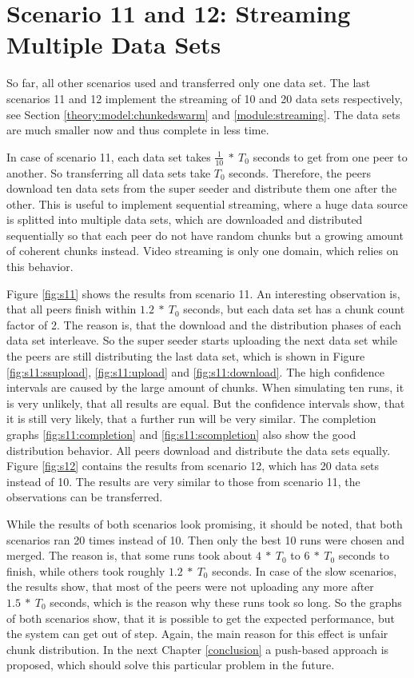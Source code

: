 \pagebreak
\section{Scenario 11 and 12: Streaming Multiple Data Sets}
\label{evaluation:1112}

So far, all other scenarios used and transferred only one data set. The last scenarios 11 and 12 implement the streaming of 10 and 20 data sets respectively, see Section \ref{theory:model:chunkedswarm} and \ref{module:streaming}. The data sets are much smaller now and thus complete in less time.

In case of scenario 11, each data set takes $\frac{1}{10}\:*\:T_0$ seconds to get from one peer to another. So transferring all data sets take $T_0$ seconds. Therefore, the peers download ten data sets from the super seeder and distribute them one after the other. This is useful to implement sequential streaming, where a huge data source is splitted into multiple data sets, which are downloaded and distributed sequentially so that each peer do not have random chunks but a growing amount of coherent chunks instead. Video streaming is only one domain, which relies on this behavior.

Figure \ref{fig:s11} shows the results from scenario 11. An interesting observation is, that all peers finish within $1.2\:*\:T_0$ seconds, but each data set has a chunk count factor of 2. The reason is, that the download and the distribution phases of each data set interleave. So the super seeder starts uploading the next data set while the peers are still distributing the last data set, which is shown in Figure \ref{fig:s11:ssupload}, \ref{fig:s11:upload} and \ref{fig:s11:download}. The high confidence intervals are caused by the large amount of chunks. When simulating ten runs, it is very unlikely, that all results are equal. But the confidence intervals show, that it is still very likely, that a further run will be very similar. The completion graphs \ref{fig:s11:completion} and \ref{fig:s11:scompletion} also show the good distribution behavior. All peers download and distribute the data sets equally. Figure \ref{fig:s12} contains the results from scenario 12, which has 20 data sets instead of 10. The results are very similar to those from scenario 11, the observations can be transferred.

While the results of both scenarios look promising, it should be noted, that both scenarios ran 20 times instead of 10. Then only the best 10 runs were chosen and merged. The reason is, that some runs took about $4\:*\:T_0$ to $6\:*\:T_0$ seconds to finish, while others took roughly $1.2\:*\:T_0$ seconds. In case of the slow scenarios, the results show, that most of the peers were not uploading any more after $1.5\:*\:T_0$ seconds, which is the reason why these runs took so long. So the graphs of both scenarios show, that it is possible to get the expected performance, but the system can get out of step. Again, the main reason for this effect is unfair chunk distribution. In the next Chapter \ref{conclusion} a push-based approach is proposed, which should solve this particular problem in the future.
